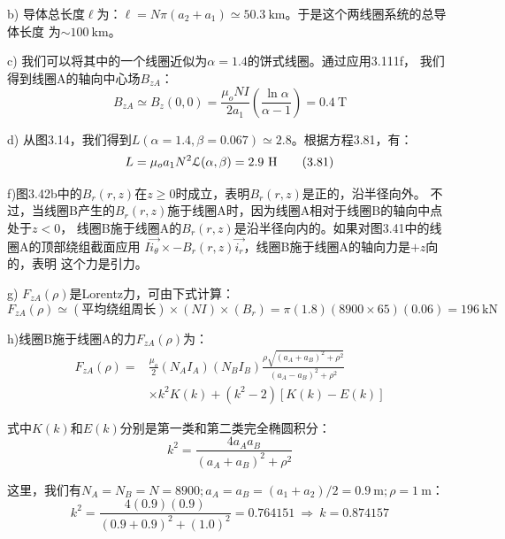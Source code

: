 b) 导体总长度$\ell$为：$\ell=N\pi(a_2+a_1)\simeq 50.3\ \mathrm{km}$。于是这个两线圈系统的总导体长度
为$\sim 100\ \mathrm{km}$。

c) 我们可以将其中的一个线圈近似为$\alpha=1.4$的饼式线圈。通过应用3.111f，
我们得到线圈A的轴向中心场$B_{zA}$：
\begin{equation*}
B_{zA}\simeq B_{z}(0,0)=\frac{\mu_{o}NI}{2a_{1}}(\frac{\ln\alpha}{\alpha-1})=0.4\ \mathrm{T} \tag{3.111f}
\end{equation*}

d) 从图3.14，我们得到$L(\alpha=1.4, \beta=0.067)\simeq 2.8$。根据方程3.81，有：
\begin{equation*}
L=\mu_{o}a_{1}N^{2}\mathcal{L}(\alpha,\beta)\\%
=2.9\ \mathrm{H} \tag{3.81}
\end{equation*}

f)图3.42b中的$B_r(r, z)$在$z\ge 0$时成立，表明$B_r(r, z)$是正的，沿半径向外。
不过，当线圈B产生的$B_r(r, z)$施于线圈A时，因为线圈A相对于线圈B的轴向中点处于$z<0$，
线圈B施于线圈A的$B_r(r, z)$是沿半径向内的。如果对图3.41中的线圈A的顶部绕组截面应用
$I\vec{i_\theta}\times-B_r(r,z)\vec{i_r}$，线圈B施于线圈A的轴向力是$+z$向的，表明
这个力是引力。

g) $F_{zA}(\rho)$是Lorentz力，可由下式计算： 
\begin{equation*}
F_{zA}(\rho)\simeq (\mbox{平均绕组周长})\times(NI)\times(B_r)=\pi(1.8)(8900\times 65)(0.06)=196\ \mathrm{kN}
\end{equation*}

h)线圈B施于线圈A的力$F_{zA}(\rho)$为：
\begin{equation*}
\begin{split}
F_{zA}(\rho)=&\frac{\mu_{o}}{2}(N_{A}I_{A})(N_{B}I_{B})\frac{\rho\sqrt{(a_{A}+a_{B})^{2}+\rho^{2}}}{(a_{A}-a_{B})^{2}+\rho^{2}}\\
&\times{k^{2}K(k)+(k^{2}-2)[K(k)-E(k)]}%
\end{split} \tag{3.34}
\end{equation*}

式中$K(k)$和$E(k)$分别是第一类和第二类完全椭圆积分：
\begin{equation*}
k^{2}=\frac{4a_{A}a_{B}}{(a_{A}+a_{B})^{2}+\rho^{2}}\tag{3.36}%
\end{equation*}

这里，我们有$N_A=N_B=N =8900; a_A=a_B=(a_1+a_2)/2=0.9\ \mathrm{m}; \rho=1\ \mathrm{m}$：
\begin{equation*}
k^2=\frac{4(0.9)(0.9)}{(0.9+0.9)^2+(1.0)^2}=0.764151\ \Rightarrow\ k=0.874157 
\end{equation*}

